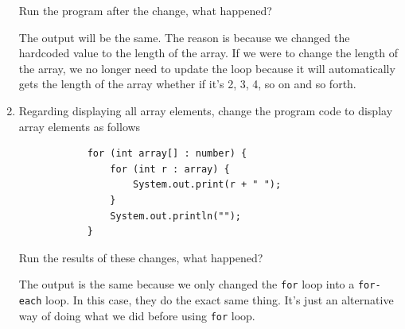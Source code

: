 \documentclass[12pt,titlepage]{article}
\begin{document}
\begin{enumerate}
{        Run the program after the change, what happened?

        The output will be the same. The reason is because we changed the hardcoded value to the length of the array.
        If we were to change the length of the array, we no longer need to update the loop because it will automatically gets the length of the array whether if it's 2, 3, 4, so on and so forth.
    }
    \item {
        Regarding displaying all array elements, change the program code to display array elements as follows

        \begin{verbatim}
            for (int array[] : number) {
                for (int r : array) {
                    System.out.print(r + " ");
                }
                System.out.println("");
            }
        \end{verbatim}

        Run the results of these changes, what happened?

        The output is the same because we only changed the \texttt{for} loop into a \texttt{for-each} loop.
        In this case, they do the exact same thing. It's just an alternative way of doing what we did before using \texttt{for} loop.
    }
\end{enumerate}
\end{document}
